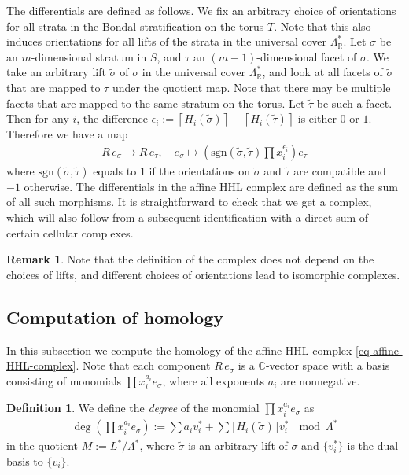 \documentclass[11pt,reqno]{amsart}
\def\C {{\mathbb C}}
\def\R {{\mathbb R}}
\theoremstyle{definition}
\newtheorem{definition}[theorem]{Definition}
\newtheorem{remark}[theorem]{Remark}
\numberwithin{equation}{section}
\begin{document}
\smallskip

The differentials are defined as follows. We fix an arbitrary choice of orientations for all strata in the Bondal stratification on the torus $T$. Note that this also induces orientations for all lifts of the strata in the universal cover $\Lambda^*_{\R}$. Let $\sigma$ be an $m$-dimensional stratum in $S$, and $\tau$ an $(m-1)$-dimensional facet of $\sigma$. We take an arbitrary lift $\widetilde{\sigma}$ of $\sigma$ in the universal cover $\Lambda^*_{\R}$, and look at all facets of $\widetilde{\sigma}$ that are mapped to $\tau$ under the quotient map. Note that there may be multiple facets that are mapped to the same stratum on the torus. Let $\widetilde{\tau}$ be such a facet. Then for any $i$, the difference $\epsilon_{i}:=\left\lceil H_{i}(\widetilde{\sigma})  \right\rceil - \left\lceil H_{i}(\widetilde{\tau})  \right\rceil $ is either $0$ or $1$. Therefore we have a map
\begin{align*}
    R\,e_{\sigma}\rightarrow R\,e_{\tau},\quad e_{\sigma}\mapsto \left(\mathrm{sgn}(\widetilde{\sigma},\widetilde{\tau})\prod x_{i}^{\epsilon_{i}}\right) e_{\tau}
\end{align*}
where $\mathrm{sgn}(\widetilde{\sigma},\widetilde{\tau})$ equals to $1$ if the orientations on $\widetilde{\sigma}$ and $\widetilde{\tau}$ are compatible and $-1$ otherwise. The differentials in the affine HHL complex are defined as the sum of all such morphisms. It is straightforward to check that we get a complex, which will also follow from a subsequent identification with a direct sum of certain cellular complexes.

\begin{remark}
    Note that the definition of the complex does not depend on the choices of lifts, and different choices of orientations lead to isomorphic complexes.
\end{remark}


\subsection{Computation of homology}

In this subsection we compute the homology of the affine HHL complex \eqref{eq-affine-HHL-complex}. Note that each component $R\,e_{\sigma}$ is a $\C$-vector space with a basis consisting of monomials $\prod x_i^{a_i} e_{\sigma}$, where all exponents $a_i$ are nonnegative.


\begin{definition}
    We define the \textit{degree} of the monomial $\prod x_i^{a_i} e_{\sigma}$ as
\begin{align*}
    \deg\left(\prod x_i^{a_i} e_{\sigma}\right) := \sum a_i v_i^* + \sum \lceil H_i(\widetilde{\sigma}) \rceil v_i^* \  \mod\Lambda^*
\end{align*}
in the quotient $M:=L^* / \Lambda^*$, where $\widetilde{\sigma}$ is an arbitrary lift of $\sigma$ and $\{v_i^*\}$ is the dual basis to $\{v_i\}$.
\end{definition}
\end{document}

